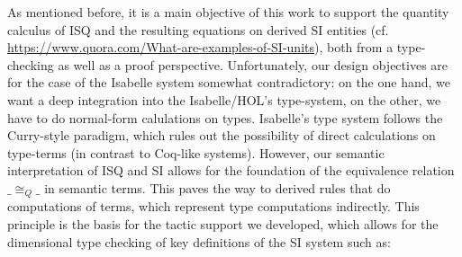 \documentclass[11pt,a4paper]{book}
\begin{document}
As mentioned before,  it is a main objective of this work to support the quantity calculus of ISQ 
and the resulting  equations on derived SI entities 
(cf. \url{https://www.quora.com/What-are-examples-of-SI-units}),
both from a type-checking as well as a proof perspective.
Unfortunately, our design objectives are for the case of the Isabelle system somewhat contradictory:
on the one hand, we want a deep integration into the Isabelle/HOL's type-system,
on the other, we have to do normal-form calulations on types.
Isabelle's type system follows the Curry-style paradigm, which rules out the possibility
of direct calculations on type-terms (in contrast to Coq-like systems). However, our semantic
interpretation of ISQ and SI allows for the foundation of the equivalence relation $\_\cong_{Q}\_$
in semantic terms. This paves the way to derived rules that do computations of terms, which
represent type computations indirectly. This principle is the basis for the tactic support we 
developed, which allows for the dimensional type checking of key definitions of the SI 
system such as:
\end{document}
